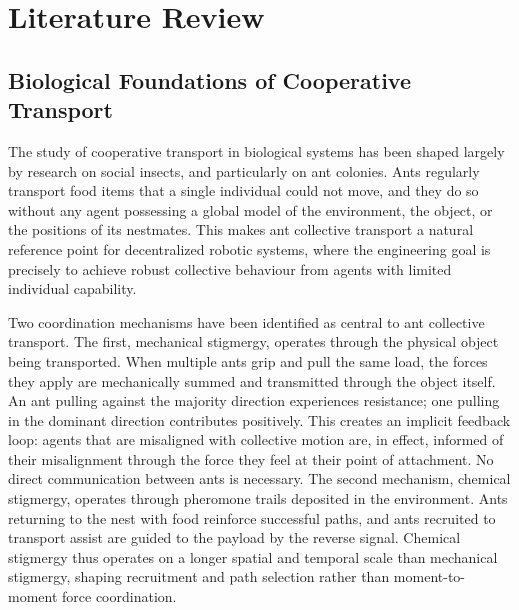 \chapter{Literature Review}
\label{ch:literature_review}

\section{Biological Foundations of Cooperative Transport}
\label{sec:bio_foundations}

The study of cooperative transport in biological systems has been shaped largely by research on social insects, and particularly on ant colonies. Ants regularly transport food items that a single individual could not move, and they do so without any agent possessing a global model of the environment, the object, or the positions of its nestmates. This makes ant collective transport a natural reference point for decentralized robotic systems, where the engineering goal is precisely to achieve robust collective behaviour from agents with limited individual capability.

Two coordination mechanisms have been identified as central to ant collective transport. The first, mechanical stigmergy, operates through the physical object being transported. When multiple ants grip and pull the same load, the forces they apply are mechanically summed and transmitted through the object itself. An ant pulling against the majority direction experiences resistance; one pulling in the dominant direction contributes positively. This creates an implicit feedback loop: agents that are misaligned with collective motion are, in effect, informed of their misalignment through the force they feel at their point of attachment. No direct communication between ants is necessary. The second mechanism, chemical stigmergy, operates through pheromone trails deposited in the environment. Ants returning to the nest with food reinforce successful paths, and ants recruited to transport assist are guided to the payload by the reverse signal. Chemical stigmergy thus operates on a longer spatial and temporal scale than mechanical stigmergy, shaping recruitment and path selection rather than moment-to-moment force coordination.

